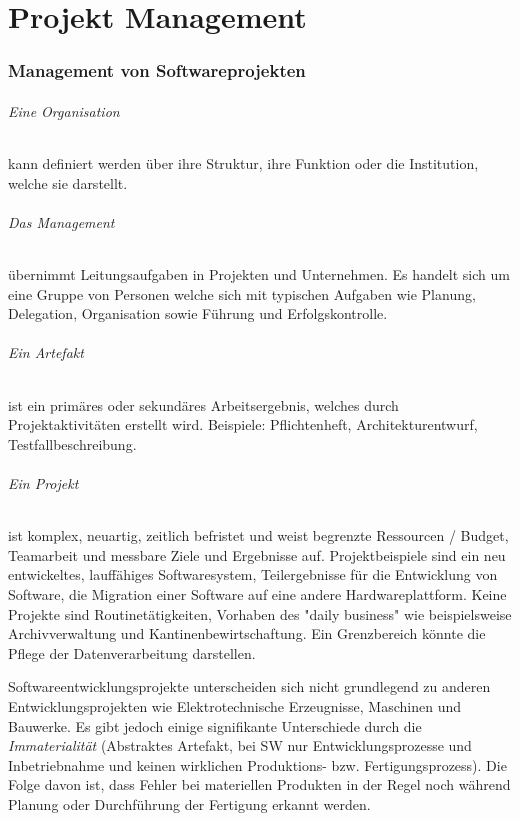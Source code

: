 \part{Projekt Management}

\section{Management von Softwareprojekten}

\paragraph{Eine Organisation} kann definiert werden über ihre Struktur, ihre Funktion oder die Institution, welche sie darstellt.

\paragraph{Das Management} übernimmt Leitungsaufgaben in Projekten und Unternehmen. Es handelt sich um eine Gruppe von Personen welche sich mit typischen Aufgaben wie Planung, Delegation, Organisation sowie Führung und Erfolgskontrolle. 

\paragraph{Ein Artefakt} ist ein primäres oder sekundäres Arbeitsergebnis, welches durch Projektaktivitäten erstellt wird. Beispiele: Pflichtenheft, Architekturentwurf, Testfallbeschreibung. 

\paragraph{Ein Projekt} ist komplex, neuartig, zeitlich befristet und weist begrenzte Ressourcen / Budget, Teamarbeit und messbare Ziele und Ergebnisse auf. Projektbeispiele sind ein neu entwickeltes, lauffähiges Softwaresystem, Teilergebnisse für die Entwicklung von Software, die Migration einer Software auf eine andere 
Hardwareplattform. 
Keine Projekte sind Routinetätigkeiten, Vorhaben des "daily business" wie beispielsweise Archivverwaltung und Kantinenbewirtschaftung. 
Ein Grenzbereich könnte die Pflege der Datenverarbeitung darstellen. 

Softwareentwicklungsprojekte unterscheiden sich nicht grundlegend zu anderen Entwicklungsprojekten wie Elektrotechnische Erzeugnisse, Maschinen und Bauwerke. Es gibt jedoch einige signifikante Unterschiede durch die \emph{Immaterialität} (Abstraktes Artefakt, bei SW nur Entwicklungsprozesse und 
Inbetriebnahme und keinen wirklichen Produktions- bzw. Fertigungsprozess). Die Folge davon ist, dass Fehler bei materiellen Produkten in der Regel noch während Planung oder Durchführung der Fertigung erkannt werden. 

